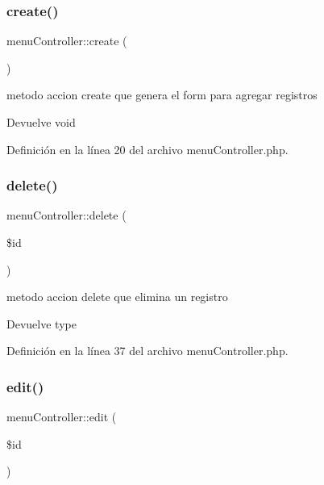 \subsubsection{\texorpdfstring{create()}{create()}}
{\footnotesize\ttfamily menu\+Controller\+::create (\begin{DoxyParamCaption}{ }\end{DoxyParamCaption})}

metodo accion create que genera el form para agregar registros

\begin{DoxyReturn}{Devuelve}
void 
\end{DoxyReturn}


Definición en la línea 20 del archivo menu\+Controller.\+php.

\mbox{\label{classmenu_controller_a3e835912cd6cdd07fd0eb71bac19c675}} 
\subsubsection{\texorpdfstring{delete()}{delete()}}
{\footnotesize\ttfamily menu\+Controller\+::delete (\begin{DoxyParamCaption}\item[{}]{\$id }\end{DoxyParamCaption})}

metodo accion delete que elimina un registro \begin{DoxyReturn}{Devuelve}
type 
\end{DoxyReturn}


Definición en la línea 37 del archivo menu\+Controller.\+php.

\mbox{\label{classmenu_controller_a302abc24e5cf18433bffd1b3eae79dd1}} 
\subsubsection{\texorpdfstring{edit()}{edit()}}
{\footnotesize\ttfamily menu\+Controller\+::edit (\begin{DoxyParamCaption}\item[{}]{\$id }\end{DoxyParamCaption})}

